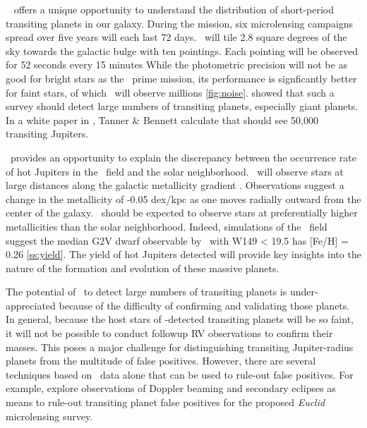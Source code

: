 \WF\ \citep{Spergel15} offers a unique opportunity to understand the distribution
of short-period transiting planets in our
galaxy.
During the mission,
six microlensing campaigns spread over five years will each last 72 days.
\WF\ will tile 2.8 square degrees of the sky
towards the galactic bulge with ten pointings.
Each pointing will be observed for 52 seconds every 15 minutes
While the photometric precision will not be as good for bright
stars as the \kep\ prime mission, its performance is signficantly
better for faint stars, of which \WF\, will observe millions
\ref{fig:noise}. \citet{BennettRhie02} showed that such a survey
should detect large numbers of transiting planets, especially giant
planets.
In a white paper in \citet{Spergel15}, Tanner \& Bennett calculate that \WF should see
50,000 transiting Jupiters.

\WF\ provides an opportunity to explain the discrepancy between the occurrence rate of hot Jupiters
in the \kep\ field and the solar neighborhood. 
\WF\ will observe stars at large distances along the galactic 
metallicity gradient \citep{Rolleston00, Pedicelli09}. 
Observations suggest a change in the metallicity of -0.05 dex/kpc as one moves
radially outward from the center of the galaxy.
\WF\ should be expected to observe stars at preferentially higher metallicities than
the solar neighborhood.
Indeed, simulations of the \WF\ field suggest the median G2V dwarf observable by \WF\ with W149 < 19.5 has
[Fe/H] = 0.26 \ref{ss:yield}.
The yield of hot Jupiters detected will provide key insights into the nature of the
formation and evolution of these massive planets.

The potential of \WF\, to detect large numbers of transiting planets
is under-appreciated because of the difficulty of confirming and
validating those planets. In general, because the host stars of
\WF-detected transiting planets will be so faint, it will not be
possible to conduct followup RV observations to confirm their
masses. This poses a major challenge for distinguishing transiting
Jupiter-radius planets from the multitude of false positives. However,
there are several techniques based on \WF\, data alone that can be
used to rule-out false positives. For example, \citet{McDonald14}
explore observations of Doppler beaming and secondary eclipses
as means to rule-out
transiting planet false positives for the proposed \textit{Euclid}
microlensing survey.

